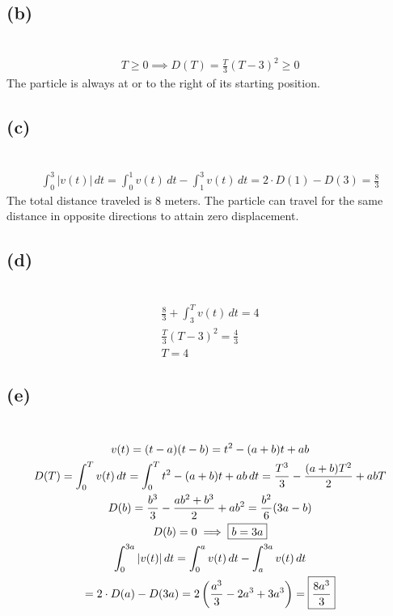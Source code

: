 \documentclass[12pt]{article}
\newcommand*{\paren}[1]{\ensuremath\left(#1\right)}
\newcommand{\vem}{\vspace{0.5em}}
\newcommand{\subproblem}[1]{\subsection{(#1)} \,}
\begin{document}
\subproblem{b}
\begin{gather*}
    T\ge 0 \implies D(T)=\frac{T}{3}(T-3)^2\ge 0
\end{gather*}
The particle is always at or to the right of its starting position. \vem

\subproblem{c}
\begin{gather*}
    \int_0^3|v(t)|\, dt=\int_0^1v(t)\, dt-\int_1^3 v(t)\, dt = 2\cdot D(1)-D(3)= \boxed{\frac{8}{3}}
\end{gather*}
The total distance traveled is 8 meters. The particle can travel for the same distance in opposite directions to attain zero displacement.\vem

\subproblem{d}
\begin{gather*}
    \frac{8}{3}+\int_3^T v(t)\, dt=4\\
    \frac{T}{3}(T-3)^2=\frac{4}{3}\\
    \boxed{T=4}
\end{gather*}

\subproblem{e}
\begin{gather*}
    v(t)=(t-a)(t-b)=t^2-(a+b)t+ab\\
    D(T)=\int_0^T v(t)\, dt=\int_0^T t^2-(a+b)t+ab \, dt= \frac{T^3}{3}-\frac{(a+b)T^2}2+abT\\
    D(b)=\frac{b^3}{3}-\frac{ab^2+b^3}{2}+ab^2=\frac{b^2}{6}(3a-b)\\
    D(b)=0 \implies \boxed{b=3a}\\
    \int_0^{3a} |v(t)|\, dt = \int_0^a v(t)\, dt- \int_a^{3a} v(t)\, dt\\
    =2\cdot D(a)-D(3a)=2\paren{\frac{a^3}{3}-2a^3+3a^3}=\boxed{\frac{8a^3}{3}}
\end{gather*}
\end{document}
